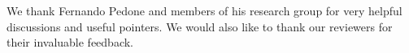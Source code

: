 \documentclass[preprint,numbers]{sigplanconf}
\begin{document}


\acks We thank Fernando Pedone and members of his research group
for very helpful discussions and useful pointers. We would also like to
thank our reviewers for their invaluable feedback.







\end{document}

